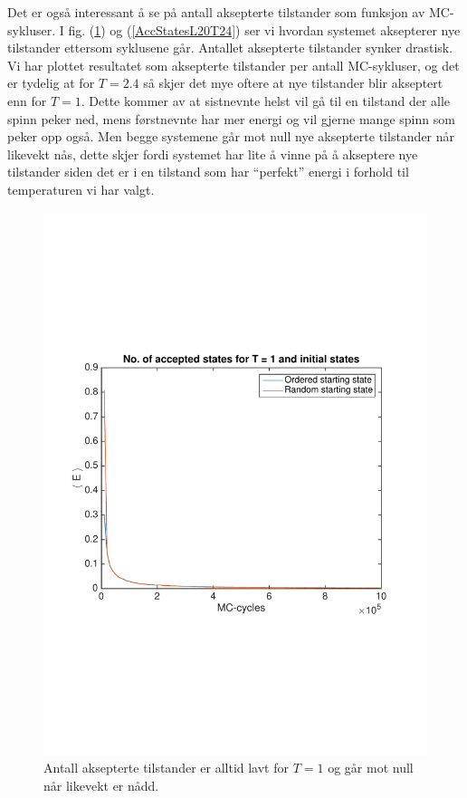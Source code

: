 \documentclass[norsk, 10pt]{article}
\begin{document}
Det er også interessant å se på antall aksepterte tilstander som funksjon av MC-sykluser. I fig. (\ref{fig:AccStatesL20T1}) og (\ref{AccStatesL20T24}) ser vi hvordan systemet aksepterer nye tilstander ettersom syklusene går. Antallet aksepterte tilstander synker drastisk. Vi har plottet resultatet som aksepterte tilstander per antall MC-sykluser, og det er tydelig at for $T=2.4$ så skjer det mye oftere at nye tilstander blir akseptert enn for $T=1$. Dette kommer av at sistnevnte helst vil gå til en tilstand der alle spinn peker ned, mens førstnevnte har mer energi og vil gjerne mange spinn som peker opp også. Men begge systemene går mot null nye aksepterte tilstander når likevekt nås, dette skjer fordi systemet har lite å vinne på å akseptere nye tilstander siden det er i en tilstand som har ``perfekt'' energi i forhold til temperaturen vi har valgt.

\begin{figure}[H]
	\centering
	\includegraphics[scale = 0.6, trim = 1cm 8cm 1cm 8cm]{AccStatesL20T1.pdf}
	\caption{Antall aksepterte tilstander er alltid lavt for $T=1$ og går mot null når likevekt er nådd.}
	\label{fig:AccStatesL20T1}
\end{figure}
\end{document}
